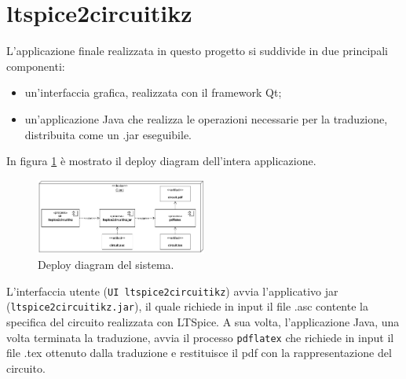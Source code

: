 \section{ltspice2circuitikz}
L'applicazione finale realizzata in questo progetto si suddivide in due principali componenti:
\begin{itemize}
	\item un'interfaccia grafica, realizzata con il framework Qt;
	\item un'applicazione Java che realizza le operazioni necessarie per la traduzione, distribuita come un .jar eseguibile.
\end{itemize}
In figura \ref{fig:deploy_diagram} è mostrato il deploy diagram dell'intera applicazione.
\begin{figure}[h!]
	\centering
	\includegraphics[width=0.5\textwidth]{./ImageFiles/deploy diagram.pdf}
	\caption{Deploy diagram del sistema.}
	\label{fig:deploy_diagram}
\end{figure}

\noindent
L'interfaccia utente (\texttt{UI ltspice2circuitikz}) avvia l'applicativo jar (\texttt{ltspice2circuitikz.jar}), il quale richiede in input il file .asc contente la specifica del circuito realizzata con LTSpice. A sua volta, l'applicazione Java, una volta terminata la traduzione, avvia il processo \texttt{pdflatex} che richiede in input il file .tex ottenuto dalla traduzione e restituisce il pdf con la rappresentazione del circuito.

